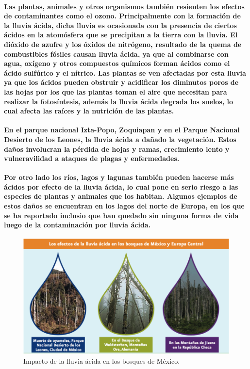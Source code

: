    \paragraph {Las plantas, animales y otros organismos también resienten los efectos de contaminantes como el ozono. Principalmente con la formación de la lluvia ácida, dicha lluvia es ocasionada con la presencia de ciertos ácidos en la atomósfera que se precipitan a la tierra con la lluvia. El dióxido de azufre y los óxidos de nitrógeno, resultado de la quema de combustibles  fósiles causan lluvia ácida, ya que al combinarse con agua, oxígeno y otros compuestos químicos forman ácidos como el ácido sulfúrico y el nítrico. Las plantas se ven afectadas por esta lluvia ya que los ácidos pueden obstruir y acidificar los diminutos poros de las hojas por los que las plantas toman el aire que necesitan para realizar la fotosíntesis, además la lluvia ácida degrada los suelos, lo cual afecta las raíces y la nutrición de las plantas.}
    
    \paragraph {En el parque nacional Izta-Popo, Zoquiapan y en el Parque Nacional Desierto de los Leones, la lluvia ácida a dañado la vegetación. Estos daños involucran la pérdida de hojas y ramas, crecimiento lento y vulneravilidad a ataques de plagas y enfermedades.}
    
    \paragraph {Por otro lado los ríos, lagos y lagunas también pueden hacerse más ácidos por efecto de la lluvia ácida, lo cual pone en serio riesgo a las especies de plantas y animales que los habitan. Algunos ejemplos de estos daños se encuentran en los lagos del norte de Europa, en los que se ha reportado inclusio que han quedado sin ninguna forma de vida luego de la contaminación por lluvia ácida.}

	\begin{figure}[h!]
	  	\centering
  	      \includegraphics[width=\textwidth]{./images/2.png}		  
  	    \caption{Impacto de la lluvia ácida en los bosques de México.}
	\end{figure}    
    
